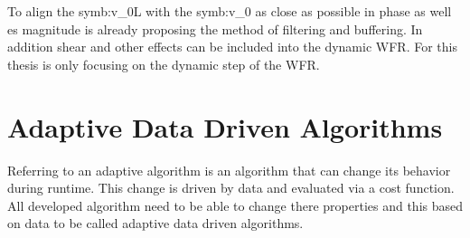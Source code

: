 \noindent To align the \gls{symb:v_0L} with the \gls{symb:v_0} as close as possible in phase as well es magnitude \cite{Schlipf2011} is already proposing the method of filtering and buffering. In addition shear and other effects can be included into the dynamic \gls{WFR}. For this thesis is only focusing on the dynamic step of the \gls{WFR}.

   
\section{Adaptive Data Driven Algorithms}\label{sec:AlgBasics}
Referring to \cite{Zaknich2005} an adaptive algorithm is an algorithm that can change its behavior during runtime. This change is driven by data and evaluated via a cost function. All developed algorithm need to be able to change there properties and this based on data to be called adaptive data driven algorithms. 